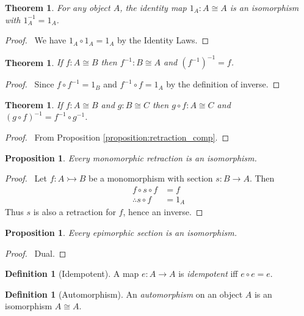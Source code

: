 \documentclass{article}
\let\qed\relax
\newtheorem{proposition}[axiom]{Proposition}
\newtheorem{thm}[axiom]{Theorem}
\theoremstyle{definition}
\newtheorem{definition}[axiom]{Definition}
\newcommand{\inv}[1]{\ensuremath{{#1}^{-1}}}
\begin{document}
\begin{thm}
    For any object $A$, the identity map $1_A : A \cong A$ is an isomorphism with $1_A^{-1} = 1_A$.
\end{thm}

\begin{proof}
    \pf\ We have $1_A \circ 1_A = 1_A$ by the Identity Laws. \qed
\end{proof}

\begin{thm}
    If $f : A \cong B$ then $\inv{f} : B \cong A$ and $\inv{(\inv{f})} = f$.
\end{thm}

\begin{proof}
    \pf\ Since $f \circ \inv{f} = 1_B$ and $\inv{f} \circ f = 1_A$ by the definition of inverse. \qed
\end{proof}

\begin{thm}
    If $f : A \cong B$ and $g : B \cong C$ then $g \circ f : A \cong C$ and
    $\inv{(g \circ f)} = \inv{f} \circ \inv{g}$.
\end{thm}

\begin{proof}
    \pf\ From Proposition \ref{proposition:retraction_comp}. \qed
\end{proof}

\begin{proposition}
    Every monomorphic retraction is an isomorphism.
\end{proposition}

\begin{proof}
    \pf\ Let $f : A \rightarrowtail B$ be a monomorphism with section $s : B \rightarrow A$. Then
    \begin{align*}
        f \circ s \circ f & = f \\
        \therefore s \circ f & = 1_A
    \end{align*}
    Thus $s$ is also a retraction for $f$, hence an inverse. \qed
\end{proof}

\begin{proposition}
    Every epimorphic section is an isomorphism.
\end{proposition}

\begin{proof}
    \pf\ Dual. \qed
\end{proof}

\begin{definition}[Idempotent]
    A map $e : A \rightarrow A$ is \emph{idempotent} iff $e \circ e = e$.
\end{definition}

\begin{definition}[Automorphism]
    An \emph{automorphism} on an object $A$ is an isomorphism $A \cong A$.
\end{definition}
\end{document}

